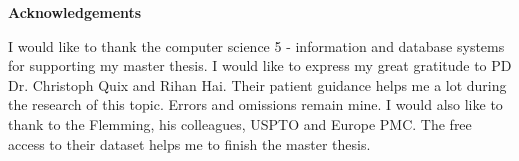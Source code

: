 \thispagestyle{empty}

\centerline{\Large{\textbf{Acknowledgements}}}

\vspace{2cm}

\noindent 
I would like to thank the computer science 5 - information and database systems for supporting my master thesis. I would like to express my great gratitude to PD Dr. Christoph Quix and Rihan Hai. Their patient guidance helps me a lot during the research of this topic. Errors and omissions remain mine. I would also like to thank to the Flemming, his colleagues, USPTO and Europe PMC. The free access to their dataset helps me to finish the master thesis. 

\newpage
\thispagestyle{empty}

\rule{0cm}{5cm}